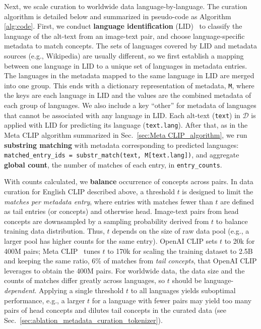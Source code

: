Next, we scale curation to worldwide data language-by-language. The curation algorithm is detailed below and summarized in pseudo-code as Algorithm \ref{alg:code}. First, we conduct \textbf{language identification} (LID)~\citep{grave2018learning} to classify the language of the alt-text from an image-text pair, and choose language-specific metadata to match concepts. 
The sets of languages covered by LID and metadata sources (e.g., Wikipedia) are usually different, so we first establish a mapping between one language in LID to a unique set of languages in metadata entries. The languages in the metadata mapped to the same language in LID are merged into one group. This ends with a dictionary representation of metadata, \texttt{M}, where the keys are each language in LID and the values are the combined metadata of each group of languages. We also include a key ``other'' for metadata of languages that cannot be associated with any language in LID. Each
alt-text (\texttt{text}) in $\mathcal{D}$ is applied with LID for predicting its language (\texttt{text.lang}). After that, as in the Meta CLIP algorithm summarized in Sec.~\ref{sec:Meta CLIP_algorithm}, we run \textbf{substring matching} with metadata corresponding to predicted languages: \texttt{matched\_entry\_ids = substr\_match(text, M[text.lang])}, and aggregate \textbf{global count}, the number of matches of each entry, in \texttt{entry\_counts}.

With counts calculated, we \textbf{balance} occurrence of concepts across pairs. In data curation for English CLIP described above, a threshold $t$ is designed to limit the \emph{matches per metadata entry}, where entries with matches fewer than $t$ are defined as tail entries (or concepts) and otherwise head. 
Image-text pairs from head concepts are downsampled by a sampling probability derived from $t$ to balance training data distribution.
Thus, $t$ depends on the size of raw data pool (e.g., a larger pool has higher counts for the same entry).
OpenAI CLIP sets $t$ to 20k for 400M pairs; Meta CLIP~\citep{xu2024demystifying} tunes $t$ to 170k for scaling the training dataset to 2.5B and keeping the same ratio, 6\% of matches from \emph{tail concepts}, that OpenAI CLIP leverages to obtain the 400M pairs.
For worldwide data, the data size and the counts of matches differ greatly across languages, so $t$ should be language-\emph{dependent}.
Applying a single threshold $t$ to all languages yields suboptimal performance, e.g., a larger $t$ for a language with fewer pairs may yield too many pairs of head concepts and dilutes tail concepts in the curated data (see Sec.~\ref{sec:ablation_metadata_curation_tokenizer}). 

